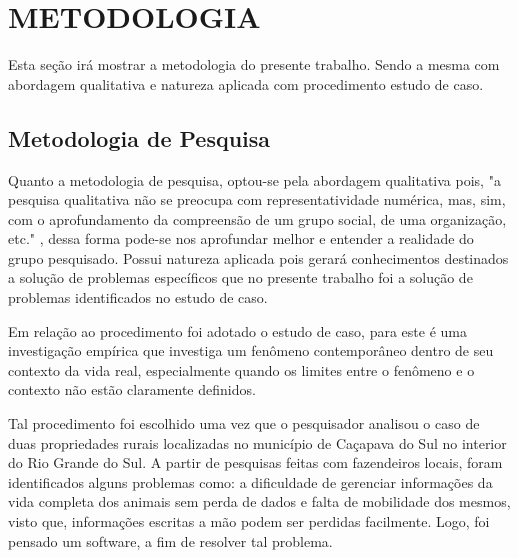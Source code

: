%
%



\section{METODOLOGIA}\label{chap:metodologia}

Esta seção irá mostrar a metodologia do presente trabalho. Sendo a mesma com abordagem qualitativa e natureza aplicada com procedimento estudo de caso.

\subsection{\textbf{Metodologia de Pesquisa}}

Quanto a metodologia de pesquisa, optou-se pela abordagem qualitativa pois, "a pesquisa qualitativa não se preocupa com representatividade numérica, mas, sim, com o aprofundamento da compreensão de um grupo social, de uma organização, etc."  \cite{ufrgs09}, dessa forma pode-se nos aprofundar melhor e entender a realidade do grupo pesquisado. Possui natureza aplicada pois gerará conhecimentos destinados a solução de problemas específicos \cite{ufrgs09} que no presente trabalho foi a solução de problemas identificados no estudo de caso.

Em relação ao procedimento foi adotado o estudo de caso, para  este é uma investigação empírica que investiga um fenômeno contemporâneo dentro de seu contexto da vida real, especialmente quando os limites entre o fenômeno e o contexto não estão claramente definidos.

Tal procedimento foi  escolhido uma vez que o pesquisador analisou o caso de duas propriedades rurais localizadas no município de Caçapava do Sul no interior do Rio Grande do Sul. A partir de pesquisas  feitas com fazendeiros locais, foram identificados alguns problemas como: a dificuldade de gerenciar informações da vida completa dos animais sem perda de  dados e falta de mobilidade dos mesmos, visto que, informações escritas a mão podem ser perdidas facilmente. Logo, foi pensado um software, a fim de resolver tal problema.


